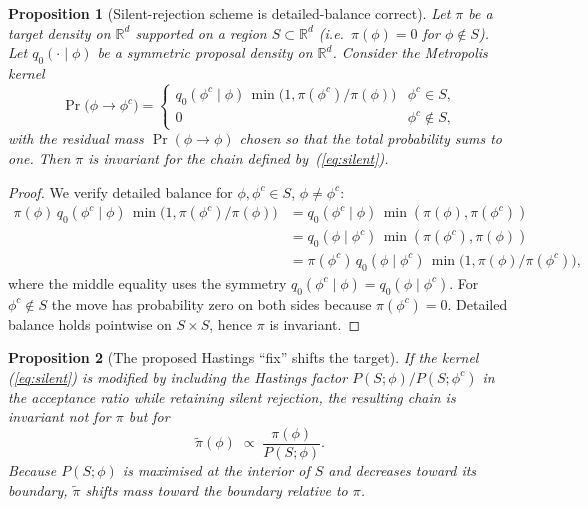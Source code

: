 \documentclass[11pt]{article}
\newcommand{\eref}[1]{(\ref{#1})}
\theoremstyle{plain}
\newtheorem{proposition}{Proposition}[section]
\theoremstyle{definition}
\theoremstyle{remark}
\begin{document}
\begin{proposition}[Silent-rejection scheme is detailed-balance correct]\label{prop:rejection}
Let $\pi$ be a target density on $\mathbb{R}^d$ supported on a region
$S \subset \mathbb{R}^d$ (i.e.\ $\pi(\phi) = 0$ for $\phi \notin S$). Let
$q_0(\cdot \mid \phi)$ be a symmetric proposal density on $\mathbb{R}^d$.
Consider the Metropolis kernel
\begin{equation}\label{eq:silent}
  \Pr\bigl(\phi \to \phi^c\bigr) =
  \begin{cases}
    q_0(\phi^c \mid \phi)\, \min\!\bigl(1, \pi(\phi^c) / \pi(\phi)\bigr) & \phi^c \in S,\\
    0 & \phi^c \notin S,
  \end{cases}
\end{equation}
with the residual mass $\Pr(\phi \to \phi)$ chosen so that the
total probability sums to one. Then $\pi$ is invariant for the chain
defined by~\eref{eq:silent}.
\end{proposition}

\begin{proof}
We verify detailed balance for $\phi, \phi^c \in S$, $\phi \neq \phi^c$:
\begin{align*}
\pi(\phi)\, q_0(\phi^c \mid \phi)\, \min\!\bigl(1, \pi(\phi^c)/\pi(\phi)\bigr)
  &= q_0(\phi^c \mid \phi)\, \min(\pi(\phi), \pi(\phi^c)) \\
  &= q_0(\phi \mid \phi^c)\, \min(\pi(\phi^c), \pi(\phi)) \\
  &= \pi(\phi^c)\, q_0(\phi \mid \phi^c)\, \min\!\bigl(1, \pi(\phi)/\pi(\phi^c)\bigr),
\end{align*}
where the middle equality uses the symmetry $q_0(\phi^c \mid \phi)
= q_0(\phi \mid \phi^c)$. For $\phi^c \notin S$ the move has probability
zero on both sides because $\pi(\phi^c) = 0$. Detailed balance holds
pointwise on $S \times S$, hence $\pi$ is invariant.
\end{proof}

\begin{proposition}[The proposed Hastings ``fix'' shifts the target]\label{prop:wrong-fix}
If the kernel \eref{eq:silent} is modified by including the Hastings
factor $P(S;\phi) / P(S;\phi^c)$ in the acceptance ratio while retaining
silent rejection, the resulting chain is invariant not for $\pi$ but for
\begin{equation}\label{eq:wrong-target}
  \widetilde\pi(\phi) \;\propto\; \frac{\pi(\phi)}{P(S; \phi)}.
\end{equation}
Because $P(S; \phi)$ is maximised at the interior of $S$ and decreases
toward its boundary, $\widetilde\pi$ shifts mass toward the boundary
relative to $\pi$.
\end{proposition}
\end{document}
